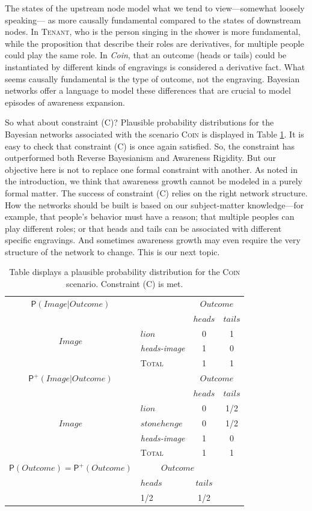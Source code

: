 \documentclass[
  11pt,
  dvipsnames,enabledeprecatedfontcommands]{scrartcl}
\newcommand{\pr}[1]{\ensuremath{\mathsf{P}(#1)}}
\newcommand{\ppr}[2]{\ensuremath{\mathsf{P}^{#1}(#2)}}
\begin{document}
The states of the upstream node model what we tend to view---somewhat
loosely speaking--- as more causally fundamental compared to the states
of downstream nodes. In \textsc{Tenant}, who is the person singing in
the shower is more fundamental, while the proposition that describe
their roles are derivatives, for multiple people could play the same
role. In \textit{Coin}, that an outcome (heads or tails) could be
instantiated by different kinds of engravings is considered a derivative
fact. What seems causally fundamental is the type of outcome, not the
engraving. Bayesian networks offer a language to model these differences
that are crucial to model episodes of awareness expansion.

So what about constraint (C)? Plausible probability distributions for
the Bayesian networks associated with the scenario \textsc{Coin} is
displayed in Table \ref{table:coin}. It is easy to check that constraint
(C) is once again satisfied. So, the constraint has outperformed both
Reverse Bayesianism and Awareness Rigidity. But our objective here is
not to replace one formal constraint with another. As noted in the
introduction, we think that awareness growth cannot be modeled in a
purely formal matter. The success of constraint (C) relies on the right
network structure. How the networks should be built is based on our
subject-matter knowledge---for example, that people's behavior must have
a reason; that multiple peoples can play different roles; or that heads
and tails can be associated with different specific engravings. And
sometimes awareness growth may even require the very structure of the
network to change. This is our next topic.

\begin{table}
\begin{tabular}{clcc}
$\pr{Image \vert Outcome}$ & & \multicolumn{2}{c}{$Outcome$} \\
 &   & $heads$ & $tails$ \\
\multirow{2}{*}{$Image$} & $lion$ & 0 & 1\\
& \textit{heads-image} & 1 & 0 \\
\hline
& \textsc{Total} & 1 & 1 \\
\hline
\hline
$\ppr{+}{Image \vert Outcome}$ & & \multicolumn{2}{c}{$Outcome$} \\
&  & $heads$ & $tails$ \\
\multirow{3}{*}{$Image$} & $lion$ & 0 & 1/2\\ 
& $stonehenge$ & 0 & 1/2 \\
& \textit{heads-image} & 1 & 0 \\
\hline
& \textsc{Total} & 1 & 1 \\
\hline
\hline
$\pr{Outcome}=\ppr{+}{Outcome}$ & \multicolumn{2}{c}{$Outcome$} & \\
&  $heads$ & $tails$ & \\
& 1/2 & 1/2 & \\
\end{tabular}
\caption{Table displays a plausible probability distribution for the \textsc{Coin} scenario. Constraint (C) is met.}
\label{table:coin}
\end{table}
\end{document}
